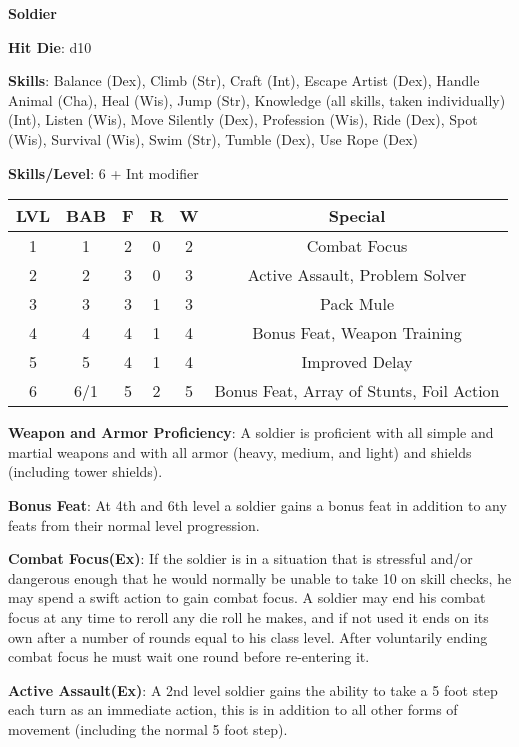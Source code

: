 \textbf{\huge{Soldier}}

\textbf{Hit Die}: d10

\textbf{Skills}: Balance (Dex), Climb (Str), Craft (Int), Escape Artist (Dex), Handle Animal (Cha), Heal (Wis), Jump (Str), Knowledge (all skills, taken individually) (Int), Listen (Wis), Move Silently (Dex), Profession (Wis), Ride (Dex), Spot (Wis), Survival (Wis), Swim (Str), Tumble (Dex), Use Rope (Dex)

\textbf{Skills/Level}: 6 + Int modifier

\begin{center}
\begin{adjustwidth}{-4cm}{}
\begin{small}
\begin{tabular}{| c | c | c | c | c | c |}
\hline
LVL &BAB &F &R &W &Special \\
\hline
1 &1 &2 &0 &2 &Combat Focus \\
2 &2 &3 &0 &3 &Active Assault, Problem Solver \\
3 &3 &3 &1 &3 &Pack Mule \\
4 &4 &4 &1 &4 &Bonus Feat, Weapon Training \\
5 &5 &4 &1 &4 &Improved Delay \\
6 &6/1 &5 &2 &5 &Bonus Feat, Array of Stunts, Foil Action \\
\hline
\end{tabular}
\end{small}
\end{adjustwidth}
\end{center}

\textbf{Weapon and Armor Proficiency}: A soldier is proficient with all simple and martial weapons and with all armor (heavy, medium, and light) and shields (including tower shields).

\textbf{Bonus Feat}: At 4th and 6th level a soldier gains a bonus feat in addition to any feats from their normal level progression.

\textbf{Combat Focus(Ex)}: If the soldier is in a situation that is stressful and/or dangerous enough that he would normally be unable to take 10 on skill checks, he may spend a swift action to gain combat focus. A soldier may end his combat focus at any time to reroll any die roll he makes, and if not used it ends on its own after a number of rounds equal to his class level. After voluntarily ending combat focus he must wait one round before re-entering it.

\textbf{Active Assault(Ex)}: A 2nd level soldier gains the ability to take a 5 foot step each turn as an immediate action, this is in addition to all other forms of movement (including the normal 5 foot step).

